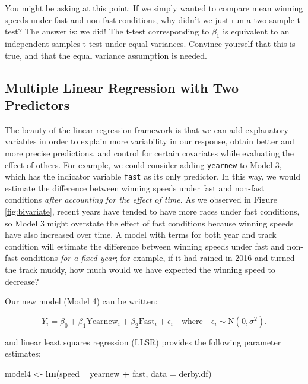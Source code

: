 \documentclass[
]{krantz}
\newenvironment{Shaded}{\begin{snugshade}}{\end{snugshade}}
\newcommand{\DataTypeTok}[1]{\textcolor[rgb]{0.27,0.27,0.27}{#1}}
\newcommand{\KeywordTok}[1]{\textcolor[rgb]{0.27,0.27,0.27}{\textbf{#1}}}
\newcommand{\NormalTok}[1]{#1}
\newcommand{\OperatorTok}[1]{\textcolor[rgb]{0.43,0.43,0.43}{\textbf{#1}}}
\newcommand{\StringTok}[1]{\textcolor[rgb]{0.5,0.5,0.5}{#1}}
\begin{document}
You might be asking at this point: If we simply wanted to compare mean winning speeds under fast and non-fast conditions, why didn't we just run a two-sample t-test? The answer is: we did! The t-test corresponding to \(\beta_{1}\) is equivalent to an independent-samples t-test under equal variances. Convince yourself that this is true, and that the equal variance assumption is needed.

\hypertarget{multiple-linear-regression-with-two-predictors}{%
\subsection{Multiple Linear Regression with Two Predictors}\label{multiple-linear-regression-with-two-predictors}}

The beauty of the linear regression framework is that we can add explanatory variables in order to explain more variability in our response, obtain better and more precise predictions, and control for certain covariates while evaluating the effect of others. For example, we could consider adding \texttt{yearnew} to Model 3, which has the indicator variable \texttt{fast} as its only predictor. In this way, we would estimate the difference between winning speeds under fast and non-fast conditions \emph{after accounting for the effect of time}. As we observed in Figure \ref{fig:bivariate}, recent years have tended to have more races under fast conditions, so Model 3 might overstate the effect of fast conditions because winning speeds have also increased over time. A model with terms for both year and track condition will estimate the difference between winning speeds under fast and non-fast conditions \emph{for a fixed year}; for example, if it had rained in 2016 and turned the track muddy, how much would we have expected the winning speed to decrease?

Our new model (Model 4) can be written:

\begin{equation}
Y_{i}=\beta_{0}+\beta_{1}\textrm{Yearnew}_{i}+\beta_{2}\textrm{Fast}_{i}+\epsilon_{i}\quad \textrm{where}\quad \epsilon_{i}\sim \textrm{N}(0,\sigma^2).
\label{eq:model4}
\end{equation}

and linear least squares regression (LLSR) provides the following parameter estimates:

\begin{Shaded}
\begin{Highlighting}[]
\NormalTok{model4 <-}\StringTok{ }\KeywordTok{lm}\NormalTok{(speed }\OperatorTok{~}\StringTok{ }\NormalTok{yearnew }\OperatorTok{+}\StringTok{ }\NormalTok{fast, }\DataTypeTok{data =}\NormalTok{ derby.df)}
\end{Highlighting}
\end{Shaded}
\end{document}
